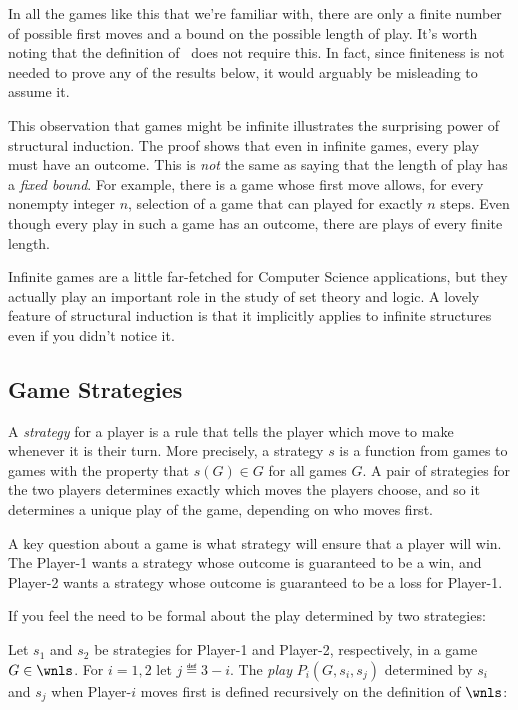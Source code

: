 \begin{definition}
In all the games like this that we're familiar with, there are only a
finite number of possible first moves and a bound on the possible
length of play.  It's worth noting that the definition of \wnls\ does
not require this.  In fact, since finiteness is not needed to prove
any of the results below, it would arguably be misleading to assume
it.

This observation that games might be infinite illustrates the
surprising power of structural induction.  The proof shows that even
in infinite games, every play must have an outcome.  This is
\emph{not} the same as saying that the length of play has a
\emph{fixed bound}.  For example, there is a game whose first move
allows, for every nonempty integer $n$, selection of a game that can
played for exactly $n$ steps.  Even though every play in such a game
has an outcome, there are plays of every finite length.

Infinite games are a little far-fetched for Computer Science
applications, but they actually play an important role in the study of
set theory and logic.  A lovely feature of structural induction is
that it implicitly applies to infinite structures even if you didn't
notice it.

\subsection{Game Strategies}

A \emph{strategy} for a player is a rule that tells the player which
move to make whenever it is their turn.  More precisely, a strategy
$s$ is a function from games to games with the property that $s(G) \in
G$ for all games $G$.  A pair of strategies for the two players
determines exactly which moves the players choose, and so it
determines a unique play of the game, depending on who moves first.

A key question about a game is what strategy will ensure that a player
will win.  The Player-1 wants a strategy whose outcome is guaranteed
to be a win, and Player-2 wants a strategy whose outcome is guaranteed
to be a loss for Player-1. 

\begin{staffnotes}
If you feel the need to be formal about the play determined by two
strategies:
\begin{definition*}
Let $s_1$ and $s_2$ be strategies for Player-1 and Player-2,
respectively, in a game $G \in \wnls$.  For $i=1,2$ let $j \eqdef
3-i$.  The \emph{play} $P_i(G,s_i,s_j)$ determined by $s_i$ and $s_j$
when Player-$i$ moves first is defined recursively on the definition
of $\wnls$:


\end{definition*}
\end{staffnotes}
\end{definition}
